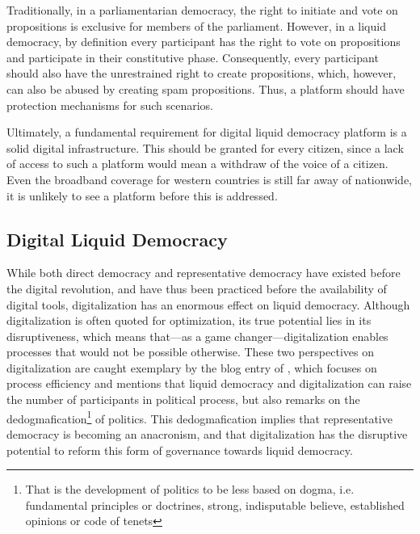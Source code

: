 Traditionally, in a parliamentarian democracy, the right to initiate and vote on propositions is exclusive for members of the parliament.
However, in a liquid democracy, by definition every participant has the right to vote on propositions and participate in their constitutive phase.
Consequently, every participant should also have the unrestrained right to create propositions, which, however, can also be abused by creating spam propositions. Thus, a platform should have protection mechanisms for such scenarios.

Ultimately, a fundamental requirement for digital liquid democracy platform is a solid digital infrastructure. This should be granted for every citizen, since a lack of access to such a platform would mean a withdraw of the voice of a citizen. Even the broadband coverage for western countries is still far away of nationwide, it is unlikely to see a platform before this is addressed.

\subsection{Digital Liquid Democracy}
\label{ssec:Digital_LD}
While both direct democracy and representative democracy have existed before the digital revolution, and have thus been practiced before the availability of digital tools, digitalization has an enormous effect on liquid democracy. Although digitalization is often quoted for optimization, its true potential lies in its disruptiveness, which means that---as a game changer---digitalization enables processes that would not be possible otherwise. These two perspectives on digitalization are caught exemplary by the blog entry of \textcite{Veuve2015}, which focuses on process efficiency and mentions that liquid democracy and digitalization can raise the number of participants in political process, but also remarks on the dedogmafication\footnote{That is the development of politics to be less based on dogma, i.e. fundamental principles or doctrines, strong, indisputable believe, established opinions or code of tenets}  of politics. This dedogmafication implies that representative democracy is becoming an anacronism, and that digitalization has the disruptive potential to reform this form of governance towards liquid democracy. 

